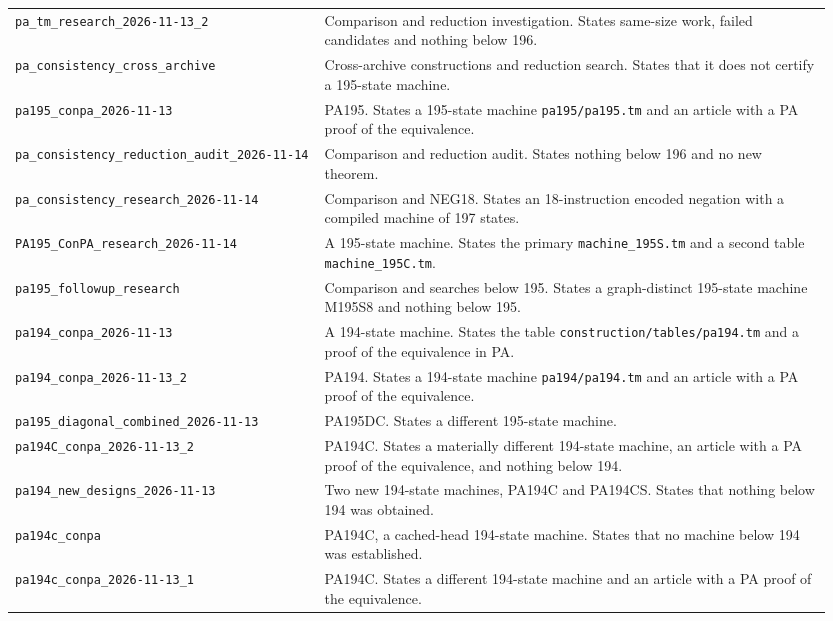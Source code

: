 \begin{longtable}{@{}>{\raggedright\arraybackslash}p{0.36\linewidth}>{\raggedright\arraybackslash}p{0.59\linewidth}@{}}
\nolinkurl{pa_tm_research_2026-11-13_2} & Comparison and reduction investigation. States same-size work, failed candidates and nothing below 196.\\[4pt]
\nolinkurl{pa_consistency_cross_archive} & Cross-archive constructions and reduction search. States that it does not certify a 195-state machine.\\[4pt]
\nolinkurl{pa195_conpa_2026-11-13} & PA195. States a 195-state machine \nolinkurl{pa195/pa195.tm} and an article with a PA proof of the equivalence.\\[4pt]
\nolinkurl{pa_consistency_reduction_audit_2026-11-14} & Comparison and reduction audit. States nothing below 196 and no new theorem.\\[4pt]
\nolinkurl{pa_consistency_research_2026-11-14} & Comparison and NEG18. States an 18-instruction encoded negation with a compiled machine of 197 states.\\[4pt]
\nolinkurl{PA195_ConPA_research_2026-11-14} & A 195-state machine. States the primary \nolinkurl{machine_195S.tm} and a second table \nolinkurl{machine_195C.tm}.\\[4pt]
\nolinkurl{pa195_followup_research} & Comparison and searches below 195. States a graph-distinct 195-state machine M195S8 and nothing below 195.\\[4pt]
\nolinkurl{pa194_conpa_2026-11-13} & A 194-state machine. States the table \nolinkurl{construction/tables/pa194.tm} and a proof of the equivalence in PA.\\[4pt]
\nolinkurl{pa194_conpa_2026-11-13_2} & PA194. States a 194-state machine \nolinkurl{pa194/pa194.tm} and an article with a PA proof of the equivalence.\\[4pt]
\nolinkurl{pa195_diagonal_combined_2026-11-13} & PA195DC. States a different 195-state machine.\\[4pt]
\nolinkurl{pa194C_conpa_2026-11-13_2} & PA194C. States a materially different 194-state machine, an article with a PA proof of the equivalence, and nothing below 194.\\[4pt]
\nolinkurl{pa194_new_designs_2026-11-13} & Two new 194-state machines, PA194C and PA194CS. States that nothing below 194 was obtained.\\[4pt]
\nolinkurl{pa194c_conpa} & PA194C, a cached-head 194-state machine. States that no machine below 194 was established.\\[4pt]
\nolinkurl{pa194c_conpa_2026-11-13_1} & PA194C. States a different 194-state machine and an article with a PA proof of the equivalence.\\[4pt]

\end{longtable}
